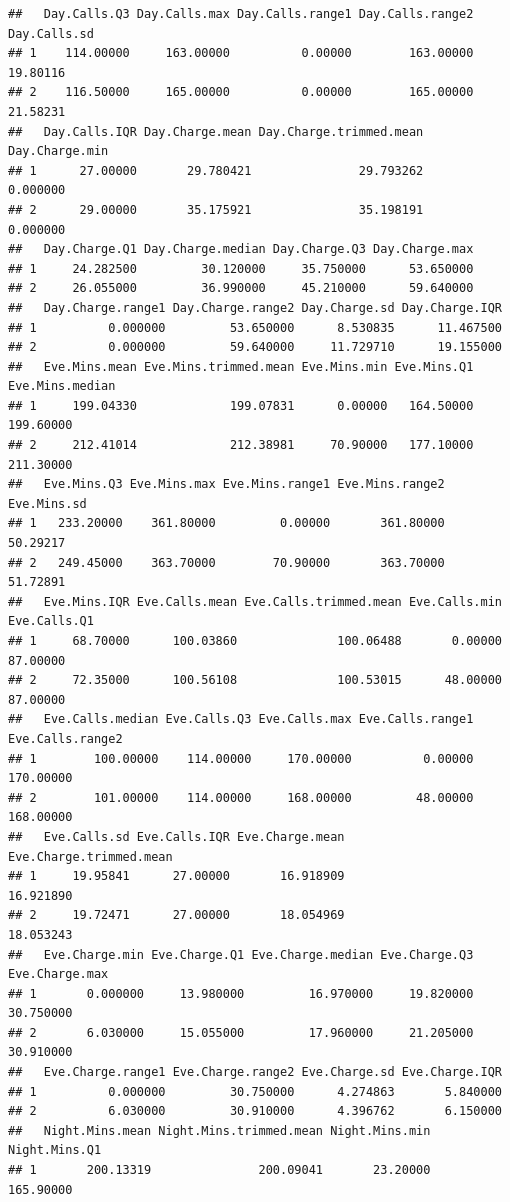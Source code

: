 \documentclass{article}\usepackage[]{graphicx}\usepackage[]{color}
\makeatletter
\newenvironment{kframe}{%
 \def\at@end@of@kframe{}%
 \ifinner\ifhmode%
  \def\at@end@of@kframe{\end{minipage}}%
  \begin{minipage}{\columnwidth}%
 \fi\fi%
 \def\FrameCommand##1{\hskip\@totalleftmargin \hskip-\fboxsep
 \colorbox{shadecolor}{##1}\hskip-\fboxsep
     \hskip-\linewidth \hskip-\@totalleftmargin \hskip\columnwidth}%
 \MakeFramed {\advance\hsize-\width
   \@totalleftmargin\z@ \linewidth\hsize
   \@setminipage}}%
 {\par\unskip\endMakeFramed%
 \at@end@of@kframe}
\newenvironment{knitrout}{}{} %
\makeatother
\begin{document}
\begin{description}
\begin{knitrout}
\begin{kframe}
\begin{verbatim}
##   Day.Calls.Q3 Day.Calls.max Day.Calls.range1 Day.Calls.range2 Day.Calls.sd
## 1    114.00000     163.00000          0.00000        163.00000     19.80116
## 2    116.50000     165.00000          0.00000        165.00000     21.58231
##   Day.Calls.IQR Day.Charge.mean Day.Charge.trimmed.mean Day.Charge.min
## 1      27.00000       29.780421               29.793262       0.000000
## 2      29.00000       35.175921               35.198191       0.000000
##   Day.Charge.Q1 Day.Charge.median Day.Charge.Q3 Day.Charge.max
## 1     24.282500         30.120000     35.750000      53.650000
## 2     26.055000         36.990000     45.210000      59.640000
##   Day.Charge.range1 Day.Charge.range2 Day.Charge.sd Day.Charge.IQR
## 1          0.000000         53.650000      8.530835      11.467500
## 2          0.000000         59.640000     11.729710      19.155000
##   Eve.Mins.mean Eve.Mins.trimmed.mean Eve.Mins.min Eve.Mins.Q1 Eve.Mins.median
## 1     199.04330             199.07831      0.00000   164.50000       199.60000
## 2     212.41014             212.38981     70.90000   177.10000       211.30000
##   Eve.Mins.Q3 Eve.Mins.max Eve.Mins.range1 Eve.Mins.range2 Eve.Mins.sd
## 1   233.20000    361.80000         0.00000       361.80000    50.29217
## 2   249.45000    363.70000        70.90000       363.70000    51.72891
##   Eve.Mins.IQR Eve.Calls.mean Eve.Calls.trimmed.mean Eve.Calls.min Eve.Calls.Q1
## 1     68.70000      100.03860              100.06488       0.00000     87.00000
## 2     72.35000      100.56108              100.53015      48.00000     87.00000
##   Eve.Calls.median Eve.Calls.Q3 Eve.Calls.max Eve.Calls.range1 Eve.Calls.range2
## 1        100.00000    114.00000     170.00000          0.00000        170.00000
## 2        101.00000    114.00000     168.00000         48.00000        168.00000
##   Eve.Calls.sd Eve.Calls.IQR Eve.Charge.mean Eve.Charge.trimmed.mean
## 1     19.95841      27.00000       16.918909               16.921890
## 2     19.72471      27.00000       18.054969               18.053243
##   Eve.Charge.min Eve.Charge.Q1 Eve.Charge.median Eve.Charge.Q3 Eve.Charge.max
## 1       0.000000     13.980000         16.970000     19.820000      30.750000
## 2       6.030000     15.055000         17.960000     21.205000      30.910000
##   Eve.Charge.range1 Eve.Charge.range2 Eve.Charge.sd Eve.Charge.IQR
## 1          0.000000         30.750000      4.274863       5.840000
## 2          6.030000         30.910000      4.396762       6.150000
##   Night.Mins.mean Night.Mins.trimmed.mean Night.Mins.min Night.Mins.Q1
## 1       200.13319               200.09041       23.20000     165.90000

\end{verbatim}
\end{kframe}
\end{knitrout}
\end{description}
\end{document}
